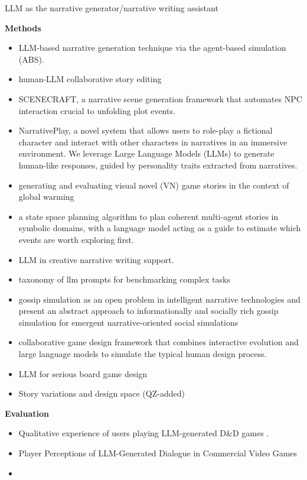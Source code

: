 LLM as the narrative generator/narrative writing assistant

\noindent \textbf{Methods}
\begin{itemize}

    \item LLM-based narrative generation technique via the agent-based simulation (ABS). \cite{10488290}
    \item human-LLM collaborative story editing \cite{kelly2023there}
    \item SCENECRAFT, a narrative scene generation framework that automates NPC interaction crucial to unfolding plot events. \cite{kumaran2023scenecraft}
    \item NarrativePlay, a novel system that allows users to role-play a fictional character and interact with other characters in narratives in an immersive environment. We leverage Large Language Models (LLMs) to generate human-like responses, guided by personality traits extracted from narratives. \cite{zhao-etal-2024-narrativeplay}
    \item generating and evaluating visual novel (VN) game stories in the context of global warming \cite{gursesli2023chronicles}
    \item a state space planning algorithm to plan coherent multi-agent stories in symbolic domains, with a language model acting as a guide to estimate which events are worth exploring first. \cite{farrell2024planning}
    \item LLM in creative narrative writing support.\cite{kreminski-martens-2022-unmet}
    \item taxonomy of llm prompts for benchmarking complex tasks \cite{santu2023teler}
    \item gossip simulation as an open problem in intelligent narrative technologies and present an abstract approach to informationally and socially rich gossip simulation for emergent narrative-oriented social simulations\cite{10333140}
    \item collaborative game design framework that combines interactive evolution and large language models to simulate the typical human design process. \cite{lanzi2023chatgpt}
    \item LLM for serious board game design\cite{junior2023chatgpt}
    \item Story variations and design space \cite{suh2024luminate} (QZ-added)
\end{itemize}

\noindent \textbf{Evaluation}
\begin{itemize}
    \item Qualitative experience of users playing LLM-generated D\&D games \cite{yong2023playing}. 
    \item Player Perceptions of LLM-Generated Dialogue in Commercial Video Games \cite{akoury2023framework}
    \item \cite{wang2023playing}

    

\end{itemize}

